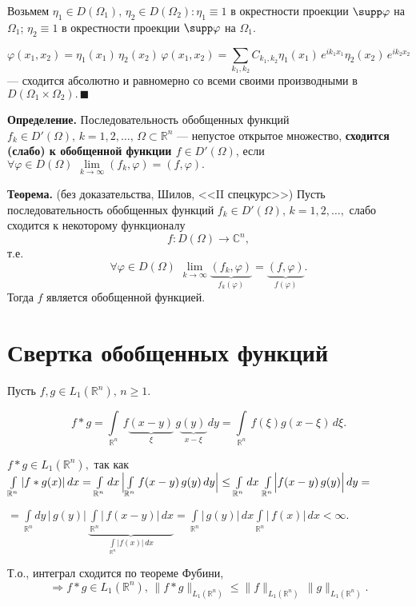 \documentclass[unicode,12pt,draft]{article}
\begin{document}
Возьмем $\eta_1\in D(\Omega_1),\,\eta_2\in D(\Omega_2)\colon
\eta_1\equiv1$ в окрестности проекции $\supp \varphi$ на
$\Omega_1$; $\eta_2\equiv1$ в окрестности проекции $\supp \varphi$
на $\Omega_1$.

$$\varphi(x_1,x_2)=\eta_1(x_1)\,\eta_2(x_2)\,\varphi(x_1,x_2)=
\sum\limits_{k_1,k_2}C_{k_1,k_2}\eta_1(x_1)\,e^{ik_1x_1}\eta_2(x_2)\,e^{ik_2x_2}$$
 --- сходится абсолютно и равномерно со всеми своими производными в
$D(\Omega_1\times\Omega_2).\,\blacksquare$


\textbf{Определение.} Последовательность обобщенных функций
$f_k\in D'(\Omega),\,k=1,2,\ldots,\,\Omega\subset\mathbb R^n$ ---
непустое открытое множество, \textbf{сходится (слабо) к обобщенной
функции $f\in D'(\Omega)$}, если $\forall\varphi\in D(\Omega)\,\,
\lim\limits_{k\to\infty}(f_k,\varphi)=(f,\varphi).$

\textbf{Теорема.} (без доказательства, Шилов, <<II спецкурс>>) Пусть
последовательность обобщенных функций $f_k\in
D'(\Omega),\,k=1,2,\ldots,$ слабо сходится к некоторому
функционалу
$$f\colon D(\Omega)\to\mathbb C^n,$$
т.е.
$$\forall\varphi\in D(\Omega)\,\,
\lim\limits_{k\to\infty}\underbrace{(f_k,\varphi)}_{f_k(\varphi)}=
\underbrace{(f,\varphi)}_{f(\varphi)}.$$
Тогда $f$ является
обобщенной функцией.

\section{Свертка обобщенных функций}

Пусть $f,g\in L_1(\mathbb R^n),\,n\ge1.$

$$f*g=\int\limits_{\mathbb
R^n}\,f\underbrace{(x-y)}_{\xi}\,g\underbrace{(y)}_{x-\xi}\,dy=
\int\limits_{\mathbb R^n}\,f(\xi)g(x-\xi)\,d\xi.$$

$f*g\in L_1(\mathbb R^n),$ так как $\int\limits_{\mathbb R^n}
|f*g(x)|\,dx= \int\limits_{\mathbb R^n}dx\,
\Bigl|\int\limits_{\mathbb R^n}f(x-y)\,g(y)\,dy\Bigr|\le
\int\limits_{\mathbb R^n}dx\, \int\limits_{\mathbb
R^n}\Bigl|f(x-y)\,g(y)\Bigr|\,dy=$

$=\int\limits_{\mathbb
R^n}dy\,|\,g(y)|\,\underbrace{\int\limits_{\mathbb
R^n}|\,f(x-y)|\,dx}_{\int\limits_{\mathbb R^n}|f(x)|\,dx}=
\int\limits_{\mathbb R^n}|\,g(y)|\,dx\int\limits_{\mathbb
R^n}|\,f(x)|\,dx<\infty.$

Т.о., интеграл сходится по теореме Фубини,
$$\Rightarrow f*g\in
L_1(\mathbb R^n),\,\|f*g\|_{L_1(\mathbb R^n)}\le\|f\|_{L_1(\mathbb
R^n)}\,\|g\|_{L_1(\mathbb R^n)}.$$
\end{document}
